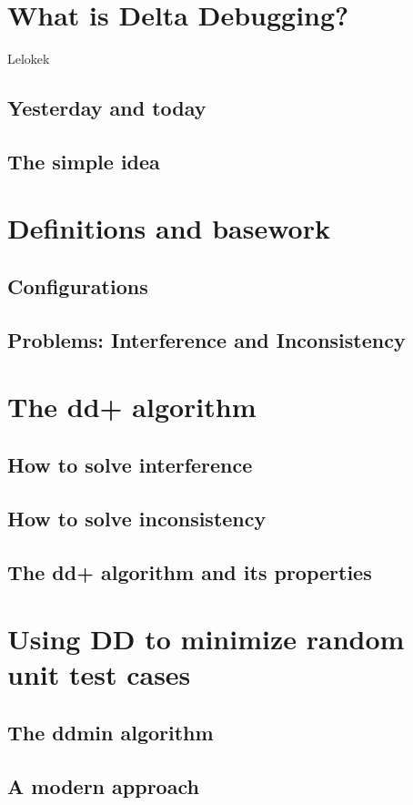 


	
\section{What is Delta Debugging?}
Lelokek
\subsection{Yesterday and today}
\subsection{The simple idea}

\section{Definitions and basework}
\subsection{Configurations}
\subsection{Problems: Interference and Inconsistency}

\section{The dd+ algorithm}
\subsection{How to solve interference}
\subsection{How to solve inconsistency}
\subsection{The dd+ algorithm and its properties}

\section{Using DD to minimize random unit test cases}
\subsection{The ddmin algorithm}
\subsection{A modern approach}


